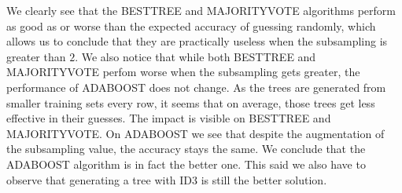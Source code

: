\documentclass[9pt]{extarticle}
\begin{document}
	We clearly see that the BESTTREE and MAJORITYVOTE algorithms perform as good as or worse than the expected accuracy of guessing randomly, which allows us to conclude that they are practically useless when the subsampling is greater than $2$.  We also notice that while both BESTTREE and MAJORITYVOTE perfom worse when the subsampling gets greater, the performance of ADABOOST does not change. As the trees are generated from smaller training sets every row, it seems that on average, those trees get less effective in their guesses. The impact is visible on BESTTREE and MAJORITYVOTE. On ADABOOST we see that despite the augmentation of the subsampling value, the accuracy stays the same. We conclude that the ADABOOST algorithm is in fact the better one. This said we also have to observe that generating a tree with ID3 is still the better solution.
\end{document}

